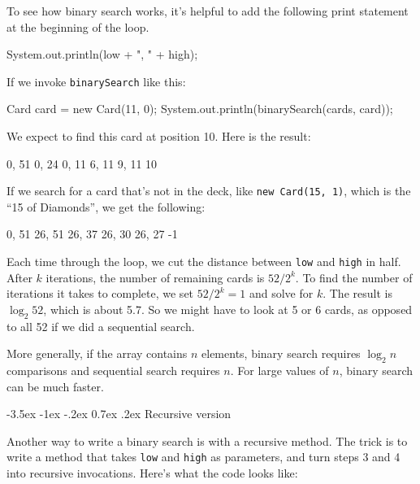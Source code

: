 \documentclass[12pt]{book}
\makeatletter
\theoremstyle{exercise}
\newcommand{\java}[1]{\verb"#1"}
\renewcommand{\section}{\@startsection{section}{1}{\z@}%
    {-3.5ex \@plus -1ex \@minus -.2ex}%
    {0.7ex \@plus.2ex}%
    {\normalfont\Large\bfseries}}
\newcommand{\java}[1]{\lstinline{#1}} %
\makeatother
\begin{document}
To see how binary search works, it's helpful to add the following print statement at the beginning of the loop.

\begin{code}
    System.out.println(low + ", " + high);
\end{code}

If we invoke \java{binarySearch} like this:

\begin{code}
    Card card = new Card(11, 0);
    System.out.println(binarySearch(cards, card));
\end{code}

We expect to find this card at position 10.
Here is the result:

\begin{stdout}
0, 51
0, 24
0, 11
6, 11
9, 11
10
\end{stdout}

If we search for a card that's not in the deck, like \java{new Card(15, 1)}, which is the ``15 of Diamonds'', we get the following:

\begin{stdout}
0, 51
26, 51
26, 37
26, 30
26, 27
-1
\end{stdout}

%

Each time through the loop, we cut the distance between \java{low} and \java{high} in half.
After $k$ iterations, the number of remaining cards is $52 / 2^k$.
To find the number of iterations it takes to complete, we set $52 / 2^k = 1$ and solve for $k$.
The result is $\log_2 52$, which is about 5.7.
So we might have to look at 5 or 6 cards, as opposed to all 52 if we did a sequential search.

More generally, if the array contains $n$ elements, binary search requires $\log_2 n$ comparisons and sequential search requires $n$.
For large values of $n$, binary search can be much faster.


\section{Recursive version}


Another way to write a binary search is with a recursive method.
The trick is to write a method that takes \java{low} and \java{high} as parameters, and turn steps 3 and 4 into recursive invocations.
Here's what the code looks like:
\end{document}
